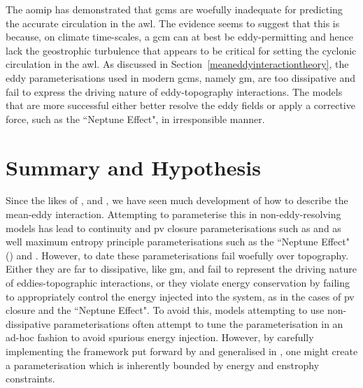 \documentclass[12pt,a4paper]{report}
\newcommand*\secref[1]{Section~\ref{#1}}
\begin{document}
The \gls{aomip} has demonstrated that \glspl{gcm} are woefully inadequate for predicting the
accurate circulation in the \gls{awl}. The evidence seems to suggest that this is because, on 
climate time-scales, a \gls{gcm} can at best be eddy-permitting and hence
lack the geostrophic turbulence that appears to be critical for setting the 
cyclonic circulation in the \gls{awl}. As discussed in \secref{meaneddyinteractiontheory},
the eddy parameterisations used in modern \glspl{gcm}, namely \gls{gm}, are too 
dissipative and fail to express the driving nature of eddy-topography interactions. 
The models that are more successful either better resolve the eddy fields or apply 
a corrective force, such as the ``Neptune Effect", in irresponsible manner. 


\section{Summary and Hypothesis}

Since the likes of \cite{young1982shear}, \cite{holloway1987systematic} and
\cite{gent1990}, we have seen much development of how to describe the mean-eddy interaction.
Attempting to parameterise this in non-eddy-resolving models has lead to 
continuity and \gls{pv} closure parameterisations such as \cite{gent1990}
and \cite{greatbatch1998exploring} as well maximum entropy principle parameterisations 
such as the ``Neptune Effect" (\cite{holloway1992representing}) and \cite{polyakov2001eddy}.
However, to date these parameterisations fail woefully over topography. Either
they are far to dissipative, like \gls{gm}, and fail to represent the driving nature
of eddies-topographic interactions, or they violate energy conservation
by failing to appropriately control the energy injected into the system, as in the cases
of \gls{pv} closure and the ``Neptune Effect". To avoid this, models attempting to
use non-dissipative parameterisations often attempt to tune the parameterisation in
an ad-hoc fashion to avoid spurious energy injection. However, by carefully implementing
the framework put forward by \cite{marshall2012framework} and generalised in
\cite{maddison2013eliassen}, one might create a parameterisation which is
inherently bounded by energy and enstrophy constraints.
\end{document}
